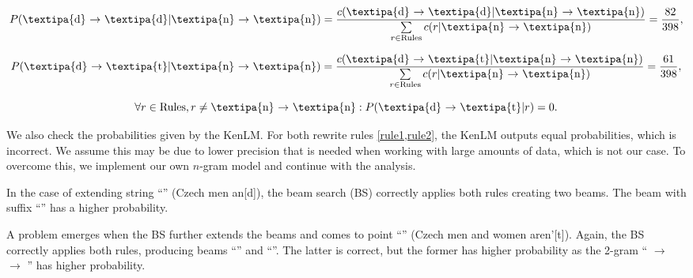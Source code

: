 \begin{equation}\label{rule1}
    P( \textnormal{\textipa{d} $\rightarrow$ \textipa{d}} | \textnormal{\textipa{n} $\rightarrow$ \textipa{n}}) =
    \frac{
        c( \textnormal{\textipa{d} $\rightarrow$ \textipa{d}} | \textnormal{\textipa{n} $\rightarrow$ \textipa{n}})
    }{
        \sum\limits_{r \in \textnormal{Rules}} c( r | \textnormal{\textipa{n} $\rightarrow$ \textipa{n}})
    } =
    \frac{82}{398},
\end{equation}

\begin{equation}\label{rule2}
P( \textnormal{\textipa{d} $\rightarrow$ \textipa{t}} | \textnormal{\textipa{n} $\rightarrow$ \textipa{n}}) =
\frac{
    c( \textnormal{\textipa{d} $\rightarrow$ \textipa{t}} | \textnormal{\textipa{n} $\rightarrow$ \textipa{n}})
}{
    \sum\limits_{r \in \textnormal{Rules}} c( r | \textnormal{\textipa{n} $\rightarrow$ \textipa{n}})
} =
\frac{61}{398},
\end{equation}

\begin{equation}
\forall r \in \textnormal{Rules}, r \neq \textnormal{\textipa{n} $\rightarrow$ \textipa{n}}: P( \textnormal{\textipa{d} $\rightarrow$ \textipa{t}} | r) = 0.
\end{equation}

We also check the probabilities given by the KenLM. For both rewrite rules \cref{rule1,rule2}, the KenLM outputs equal probabilities, which is incorrect. We assume this may be due to lower precision that is needed when working with large amounts of data, which is not our case. To overcome this, we implement our own $n$-gram model and continue with the analysis.

In the case of extending string ``'' (Czech men an[d]), the beam search (BS) correctly applies both rules creating two beams. The beam with suffix ``'' has a higher probability.

A problem emerges when the BS further extends the beams and comes to point ``'' (Czech men and women aren'[t]). Again, the BS correctly applies both rules, producing beams ``'' and ``''. The latter is correct, but the former has higher probability as the 2-gram `` $\rightarrow$   $\rightarrow$ '' has higher probability.

